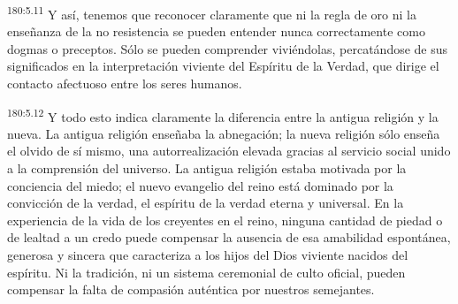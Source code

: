 \par 
\textsuperscript{180:5.11} Y así, tenemos que reconocer claramente que ni la regla de oro ni la enseñanza de la no resistencia se pueden entender nunca correctamente como dogmas o preceptos. Sólo se pueden comprender viviéndolas, percatándose de sus significados en la interpretación viviente del Espíritu de la Verdad, que dirige el contacto afectuoso entre los seres humanos.

\par 
\textsuperscript{180:5.12} Y todo esto indica claramente la diferencia entre la antigua religión y la nueva. La antigua religión enseñaba la abnegación; la nueva religión sólo enseña el olvido de sí mismo, una autorrealización elevada gracias al servicio social unido a la comprensión del universo. La antigua religión estaba motivada por la conciencia del miedo; el nuevo evangelio del reino está dominado por la convicción de la verdad, el espíritu de la verdad eterna y universal. En la experiencia de la vida de los creyentes en el reino, ninguna cantidad de piedad o de lealtad a un credo puede compensar la ausencia de esa amabilidad espontánea, generosa y sincera que caracteriza a los hijos del Dios viviente nacidos del espíritu. Ni la tradición, ni un sistema ceremonial de culto oficial, pueden compensar la falta de compasión auténtica por nuestros semejantes.

